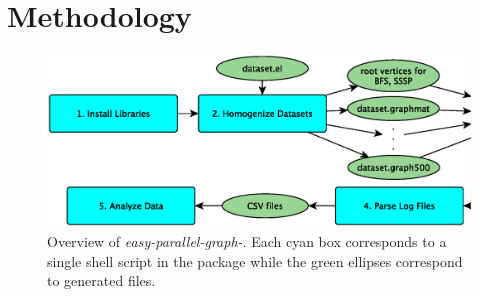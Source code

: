 \documentclass[conference]{IEEEtran}
\begin{document}



\section{Methodology}\label{sec:meth}

\begin{figure}
	\centering
	\includegraphics[width=\linewidth, trim=0 8pt 0pt 8pt, clip]{graphics/overview.eps}
	\caption{Overview of \emph{easy-parallel-graph-\textasteriskcentered}. Each cyan box corresponds to a single shell script in the package while the green ellipses correspond to generated files.}
	\label{fig:epg-overview}
\end{figure}
\end{document}
